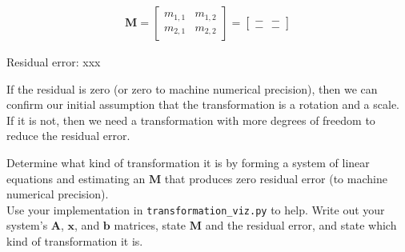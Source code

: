 \documentclass{csci1430}
\begin{document}
\begin{answer}
\begin{align*}
    \textbf{M} = \begin{bmatrix} m_{1,1} & m_{1,2} \\ m_{2,1} & m_{2,2} \end{bmatrix} = \begin{bmatrix} \_\_ & \_\_ \\ \_\_ & \_\_ \end{bmatrix}
\end{align*}

Residual error: xxx
\end{answer}

\pagebreak
\begin{subquestion}[points=4,drawbox=false]
If the residual is zero (or zero to machine numerical precision), then we can confirm our initial assumption that the transformation is a rotation and a scale. If it is not, then we need a transformation with more degrees of freedom to reduce the residual error.
\end{subquestion}

\begin{orangebox}
Determine what kind of transformation it is by forming a system of linear equations and estimating an $\mathbf{M}$ that produces zero residual error (to machine numerical precision).\\

Use your implementation in \texttt{transformation\_viz.py} to help.
Write out your system's $\mathbf{A}$, $\mathbf{x}$, and $\mathbf{b}$ matrices, state $\mathbf{M}$ and the residual error, and state which kind of transformation it is.
\end{orangebox}
    
\begin{answer}[height=30]
\end{answer}
\end{document}
